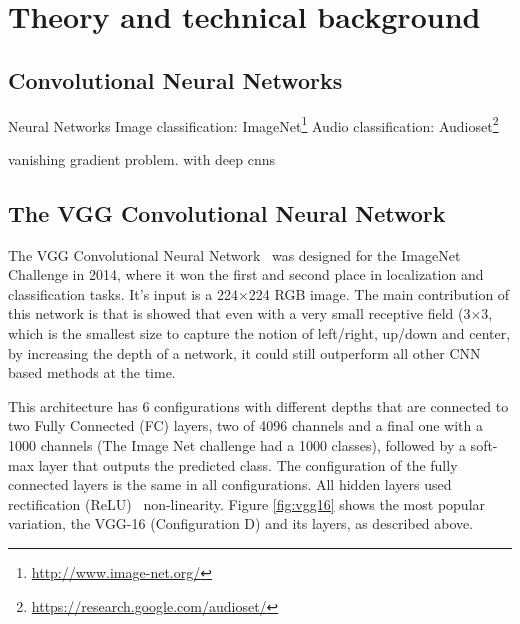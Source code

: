\newpage

\chapter{Theory and technical background}
\label{chap:theory}

\section{Convolutional Neural Networks}\label{sec:CNN}
Neural Networks
Image classification: ImageNet\footnote{\url{http://www.image-net.org/}}
Audio classification: Audioset\footnote{\url{https://research.google.com/audioset/}}

vanishing gradient problem. with deep cnns

\section{The VGG Convolutional Neural Network}\label{sec:VGGish}

The VGG Convolutional Neural Network~\cite{simonyan2014VGG} was designed for the ImageNet Challenge in 2014, where it won the first and second place in localization and classification tasks. It's input is a 224$\times$224 RGB image. The main contribution of this network is that is showed that even with a very small receptive field (3$\times$3, which is the smallest size to capture the notion of left/right, up/down and center, by increasing the depth of a network, it could still outperform all other CNN based methods at the time.

This architecture has 6 configurations with different depths that are connected to two Fully Connected (FC) layers, two of 4096 channels and a final one with a 1000 channels (The Image Net challenge had a 1000 classes), followed by a soft-max layer that outputs the predicted class.
The configuration of the fully connected layers is the same in all configurations. All hidden layers used rectification (ReLU)~\cite{krizhevsky2012relu} non-linearity. Figure \ref{fig:vgg16} shows the most popular variation, the VGG-16 (Configuration D) and its layers, as described above.

